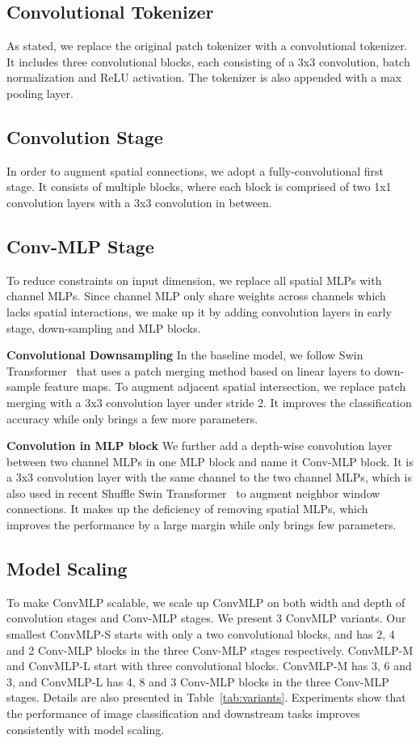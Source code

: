\documentclass[final]{cvpr}
\begin{document}
\subsection{Convolutional Tokenizer}
As stated, we replace the original patch tokenizer with a convolutional tokenizer. It includes three convolutional blocks, each consisting of a 3x3 convolution, batch normalization and ReLU activation. The tokenizer is also appended with a max pooling layer.

\subsection{Convolution Stage}
In order to augment spatial connections, we adopt a fully-convolutional first stage. It consists of multiple blocks, where each block is comprised of two 1x1 convolution layers with a 3x3 convolution in between.

\subsection{Conv-MLP Stage}
To reduce constraints on input dimension, we replace all spatial MLPs with channel MLPs. Since channel MLP only share weights across channels which lacks spatial interactions, we make up it by adding convolution layers in early stage, down-sampling and MLP blocks.

\noindent \textbf{Convolutional Downsampling} In the baseline model, we follow Swin Transformer~\cite{liu2021swin} that uses a patch merging method based on linear layers to down-sample feature maps. To augment adjacent spatial intersection, we replace patch merging with a 3x3 convolution layer under stride 2. It improves the classification accuracy while only brings a few more parameters.

\noindent \textbf{Convolution in MLP block} We further add a depth-wise convolution layer between two channel MLPs in one MLP block and name it Conv-MLP block. It is a 3x3 convolution layer with the same channel to the two channel MLPs, which is also used in recent Shuffle Swin Transformer~\cite{huang2021shuffle} to augment neighbor window connections. It makes up the deficiency of removing spatial MLPs, which improves the performance by a large margin while only brings few parameters.  

\subsection{Model Scaling}
To make ConvMLP scalable, we scale up ConvMLP on both width and depth of convolution stages and Conv-MLP stages.
We present 3 ConvMLP variants. Our smallest ConvMLP-S starts with only a two convolutional blocks, and has 2, 4 and 2 Conv-MLP blocks in the three Conv-MLP stages respectively. ConvMLP-M and ConvMLP-L start with three convolutional blocks. ConvMLP-M has 3, 6 and 3, and ConvMLP-L has 4, 8 and 3 Conv-MLP blocks in the three Conv-MLP stages. Details are also presented in Table~\ref{tab:variants}.
Experiments show that the performance of image classification and downstream tasks improves consistently with model scaling.
\end{document}
